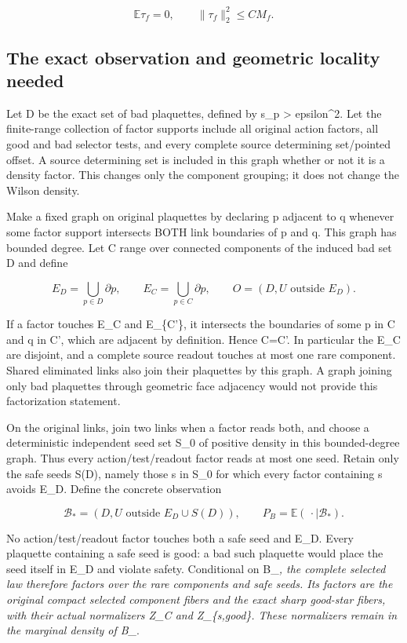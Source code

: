 \documentclass[
  11pt,
]{article}
\begin{document}
\[
 \mathbb E\tau_f=0,
 \qquad \|\tau_f\|_2^2\le C M_f.
 \tag{1.7}
\]

\hypertarget{the-exact-observation-and-geometric-locality-needed}{%
\subsection{The exact observation and geometric locality
needed}\label{the-exact-observation-and-geometric-locality-needed}}

Let D be the exact set of bad plaquettes, defined by s\_p \textgreater{}
epsilon\^{}2. Let the finite-range collection of factor supports include
all original action factors, all good and bad selector tests, and every
complete source determining set/pointed offset. A source determining set
is included in this graph whether or not it is a density factor. This
changes only the component grouping; it does not change the Wilson
density.

Make a fixed graph on original plaquettes by declaring p adjacent to q
whenever some factor support intersects BOTH link boundaries of p and q.
This graph has bounded degree. Let C range over connected components of
the induced bad set D and define

\[
 E_D=\bigcup_{p\in D}\partial p,
 \qquad E_C=\bigcup_{p\in C}\partial p,
 \qquad O=(D,U\text{ outside }E_D).
 \tag{2.0}
\]

If a factor touches E\_C and E\_\{C'\}, it intersects the boundaries of
some p in C and q in C', which are adjacent by definition. Hence C=C'.
In particular the E\_C are disjoint, and a complete source readout
touches at most one rare component. Shared eliminated links also join
their plaquettes by this graph. A graph joining only bad plaquettes
through geometric face adjacency would not provide this factorization
statement.

On the original links, join two links when a factor reads both, and
choose a deterministic independent seed set S\_0 of positive density in
this bounded-degree graph. Thus every action/test/readout factor reads
at most one seed. Retain only the safe seeds S(D), namely those s in
S\_0 for which every factor containing s avoids E\_D. Define the
concrete observation

\[
 \mathcal B_*=(D,U\text{ outside }E_D\cup S(D)),\qquad
 P_B=\mathbb E(\,\cdot\mid\mathcal B_*).
 \tag{2.1}
\]

No action/test/readout factor touches both a safe seed and E\_D. Every
plaquette containing a safe seed is good: a bad such plaquette would
place the seed itself in E\_D and violate safety. Conditional on
B\_\emph{, the complete selected law therefore factors over the rare
components and safe seeds. Its factors are the original compact selected
component fibers and the exact sharp good-star fibers, with their actual
normalizers Z\_C and Z\_\{s,good\}. These normalizers remain in the
marginal density of B\_}.
\end{document}
